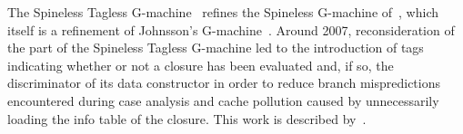 The Spineless Tagless G-machine~\citep{Peyton-Jones:Implementing:1992,Peyton-Jones:The-Spineless:1989} refines the Spineless G-machine of~\citet{Hammond:The-Spineless:1993}, which itself is a refinement of Johnsson's G-machine~\citep{Johnsson:Efficient:2004}. Around 2007, reconsideration of the  part of the Spineless Tagless G-machine led to the introduction of tags indicating whether or not a closure has been evaluated and, if so, the discriminator of its data constructor in order to reduce branch mispredictions encountered during case analysis and cache pollution caused by unnecessarily loading the info table of the closure. This work is described by~\citet{Marlow:Faster:2007}.